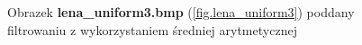 \documentclass{classrep}
\begin{document}
\begin{figure}
{{  \label{fig.lena_uniform3_average_5x5}
 }
}
\caption{Obrazek \textbf{lena\_uniform3.bmp} (\ref{fig.lena_uniform3}) poddany filtrowaniu z wykorzystaniem średniej arytmetycznej}
\label{fig.lena_uniform3_average}
\end{figure}
\end{document}
